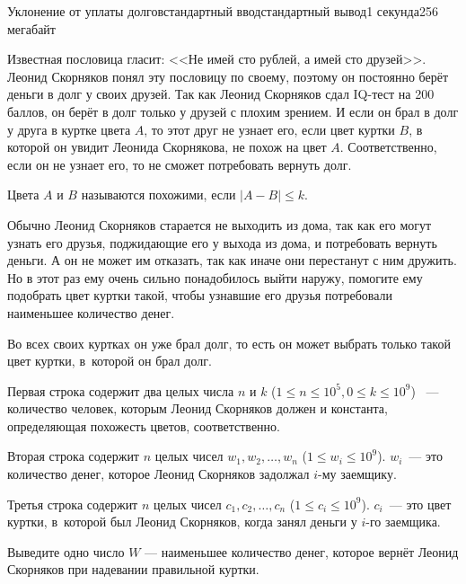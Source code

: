 \begin{problem}{Уклонение от уплаты долгов}{стандартный ввод}{стандартный вывод}{1 секунда}{256 мегабайт}

Известная пословица гласит: <<Не имей сто рублей, а имей сто друзей>>. Леонид Скорняков понял эту пословицу по своему, поэтому он постоянно берёт деньги в долг у своих друзей. Так как Леонид Скорняков сдал IQ-тест на 200 баллов, он берёт в долг только у друзей с плохим зрением. И если он брал в долг у друга в куртке цвета $A$, то этот друг не узнает его, если цвет куртки $B$, в которой он увидит Леонида Скорнякова, не похож на цвет $A$. Соответственно, если он не узнает его, то не сможет потребовать вернуть долг. 

Цвета $A$ и $B$ называются похожими, если $|A - B| \leq k$. 

Обычно Леонид Скорняков старается не выходить из дома, так как его могут узнать его друзья, поджидающие его у выхода из дома, и потребовать вернуть деньги. А он не может им отказать, так как иначе они перестанут с ним дружить. Но в этот раз ему очень сильно понадобилось выйти наружу, помогите ему подобрать цвет куртки такой, чтобы узнавшие его друзья потребовали наименьшее количество денег. 

Во всех своих куртках он уже брал долг, то есть он может выбрать только такой цвет куртки, в~которой он брал долг.

\InputFile
Первая строка содержит два целых числа $n$ и $k$ ($1 \leq n \leq 10^5, 0 \leq k \leq 10^9$) ~--- количество человек, которым Леонид Скорняков должен и константа, определяющая похожесть цветов, соответственно. 

Вторая строка содержит $n$ целых чисел $w_1, w_2, \dots, w_n$ ($1 \leq w_i \leq 10^9$).  $w_i$~--- это количество денег, которое Леонид Скорняков задолжал $i$-му заемщику. 

Третья строка содержит $n$ целых чисел $c_1, c_2, \dots, c_n$ ($1 \leq c_i \leq 10^9$). $c_i$~--- это цвет куртки, в~которой был Леонид Скорняков, когда занял деньги у $i$-го заемщика.

\OutputFile
Выведите одно число $W$ --- наименьшее количество денег, которое вернёт Леонид Скорняков при надевании правильной куртки.

\Example

\begin{example}
%
\end{example}

\end{problem}

